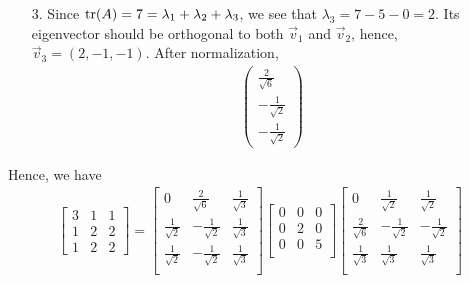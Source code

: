 \documentclass[pdf,9pt]{beamer}
\begin{document}
\begin{frame}[fragile]
    \begin{solution}[continued]
   \begin{enumerate}
       \item[3.] Since $\mbox{tr}(A)=7 = \lambda_1+\lambda_2+\lambda_3$, we see
	   that $\lambda_3 = 7-5-0=2$. Its eigenvector should be orthogonal to
	   both $\vec{v}_1$ and $\vec{v}_2$, hence,
	   $\vec{v}_3 = (2,-1,-1)$. After normalization,
	   \begin{align*}
	    \begin{pmatrix}
        \frac{2}{\sqrt{6}} \\
        -\frac{1}{\sqrt{2}} \\
        -\frac{1}{\sqrt{2}}
	    \end{pmatrix}
	   \end{align*}
   \end{enumerate}
   \bigskip
   \pause
   Hence, we have
   \begin{align*}
      \left[\begin{array}{rrr}
        3 & 1 & 1 \\
        1 & 2 & 2 \\
        1 & 2 & 2
      \end{array}\right]
      =
    \begin{bmatrix}
      0 		   & \frac{2}{\sqrt{6}}  & \frac{1}{\sqrt{3}}\\
      \frac{1}{\sqrt{2}} & -\frac{1}{\sqrt{2}} & \frac{1}{\sqrt{3}}\\
      \frac{1}{\sqrt{2}} & -\frac{1}{\sqrt{2}} & \frac{1}{\sqrt{3}}\\
    \end{bmatrix}
    \begin{bmatrix}
      0 & 0 & 0\\
      0 & 2 & 0\\
      0 & 0 & 5\\
    \end{bmatrix}
    \begin{bmatrix}
      0                  & \frac{1}{\sqrt{2}}  & \frac{1}{\sqrt{2}}  \\
      \frac{2}{\sqrt{6}} & -\frac{1}{\sqrt{2}} & -\frac{1}{\sqrt{2}} \\
      \frac{1}{\sqrt{3}} & \frac{1}{\sqrt{3}}  & \frac{1}{\sqrt{3}}  \\
    \end{bmatrix}
   \end{align*}
   \myQED
   \end{solution}
\end{frame}
\end{document}
